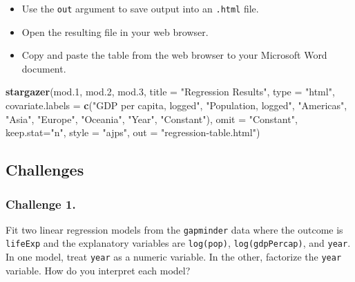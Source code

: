\documentclass[
]{book}
\newenvironment{Shaded}{\begin{snugshade}}{\end{snugshade}}
\newcommand{\DataTypeTok}[1]{\textcolor[rgb]{0.13,0.29,0.53}{#1}}
\newcommand{\FloatTok}[1]{\textcolor[rgb]{0.00,0.00,0.81}{#1}}
\newcommand{\KeywordTok}[1]{\textcolor[rgb]{0.13,0.29,0.53}{\textbf{#1}}}
\newcommand{\NormalTok}[1]{#1}
\newcommand{\StringTok}[1]{\textcolor[rgb]{0.31,0.60,0.02}{#1}}
\providecommand{\tightlist}{%
  \setlength{\itemsep}{0pt}\setlength{\parskip}{0pt}}
\begin{document}
\begin{itemize}
\tightlist
\item
  Use the \texttt{out} argument to save output into an \texttt{.html} file.
\item
  Open the resulting file in your web browser.
\item
  Copy and paste the table from the web browser to your Microsoft Word document.
\end{itemize}

\begin{Shaded}
\begin{Highlighting}[]
\KeywordTok{stargazer}\NormalTok{(mod}\FloatTok{.1}\NormalTok{, mod}\FloatTok{.2}\NormalTok{, mod}\FloatTok{.3}\NormalTok{, }\DataTypeTok{title =} \StringTok{"Regression Results"}\NormalTok{, }\DataTypeTok{type =} \StringTok{"html"}\NormalTok{, }
          \DataTypeTok{covariate.labels  =} \KeywordTok{c}\NormalTok{(}\StringTok{"GDP per capita, logged"}\NormalTok{, }\StringTok{"Population, logged"}\NormalTok{, }\StringTok{"Americas"}\NormalTok{, }\StringTok{"Asia"}\NormalTok{, }\StringTok{"Europe"}\NormalTok{, }\StringTok{"Oceania"}\NormalTok{, }\StringTok{"Year"}\NormalTok{, }\StringTok{"Constant"}\NormalTok{), }
          \DataTypeTok{omit =} \StringTok{"Constant"}\NormalTok{, }
          \DataTypeTok{keep.stat=}\StringTok{"n"}\NormalTok{, }\DataTypeTok{style =} \StringTok{"ajps"}\NormalTok{,}
          \DataTypeTok{out =} \StringTok{"regression-table.html"}\NormalTok{)}
\end{Highlighting}
\end{Shaded}

\hypertarget{challenges-10}{%
\subsection{Challenges}\label{challenges-10}}

\hypertarget{challenge-1.-8}{%
\subsubsection*{Challenge 1.}\label{challenge-1.-8}}

Fit two linear regression models from the \texttt{gapminder} data where the outcome is \texttt{lifeExp} and the explanatory variables are \texttt{log(pop)}, \texttt{log(gdpPercap)}, and \texttt{year}. In one model, treat \texttt{year} as a numeric variable. In the other, factorize the \texttt{year} variable. How do you interpret each model?
\end{document}
